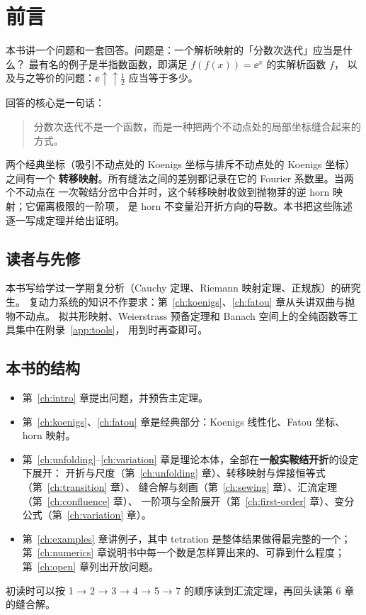 \chapter*{前言}\label{ch:preface}

本书讲一个问题和一套回答。问题是：一个解析映射的「分数次迭代」应当是什么？
最有名的例子是半指数函数，即满足 $f(f(x))=\ee^x$ 的实解析函数 $f$，
以及与之等价的问题：$\ee\uparrow\uparrow\tfrac12$ 应当等于多少。

回答的核心是一句话：
\begin{quote}
分数次迭代不是一个函数，而是一种把两个不动点处的局部坐标缝合起来的方式。
\end{quote}
两个经典坐标（吸引不动点处的 Koenigs 坐标与排斥不动点处的 Koenigs 坐标）之间有一个
\textbf{转移映射}。所有缝法之间的差别都记录在它的 Fourier 系数里。当两个不动点在
一次鞍结分岔中合并时，这个转移映射收敛到抛物芽的逆 horn 映射；它偏离极限的一阶项，
是 horn 不变量沿开折方向的导数。本书把这些陈述逐一写成定理并给出证明。

\section*{读者与先修}

本书写给学过一学期复分析（Cauchy 定理、Riemann 映射定理、正规族）的研究生。
复动力系统的知识不作要求：第~\ref{ch:koenigs}、\ref{ch:fatou} 章从头讲双曲与抛物不动点。
拟共形映射、Weierstrass 预备定理和 Banach 空间上的全纯函数等工具集中在附录~\ref{app:tools}，
用到时再查即可。

\section*{本书的结构}

\begin{itemize}[leftmargin=2em]
\item 第~\ref{ch:intro} 章提出问题，并预告主定理。
\item 第~\ref{ch:koenigs}、\ref{ch:fatou} 章是经典部分：Koenigs 线性化、Fatou 坐标、horn 映射。
\item 第~\ref{ch:unfolding}--\ref{ch:variation} 章是理论本体，全部在\textbf{一般实鞍结开折}的设定下展开：
  开折与尺度（第~\ref{ch:unfolding} 章）、转移映射与焊接恒等式（第~\ref{ch:transition} 章）、
  缝合解与刻画（第~\ref{ch:sewing} 章）、汇流定理（第~\ref{ch:confluence} 章）、
  一阶项与全阶展开（第~\ref{ch:first-order} 章）、变分公式（第~\ref{ch:variation} 章）。
\item 第~\ref{ch:examples} 章讲例子，其中 tetration 是整体结果做得最完整的一个；
  第~\ref{ch:numerics} 章说明书中每一个数是怎样算出来的、可靠到什么程度；
  第~\ref{ch:open} 章列出开放问题。
\end{itemize}
初读时可以按 1 → 2 → 3 → 4 → 5 → 7 的顺序读到汇流定理，再回头读第 6 章的缝合解。


